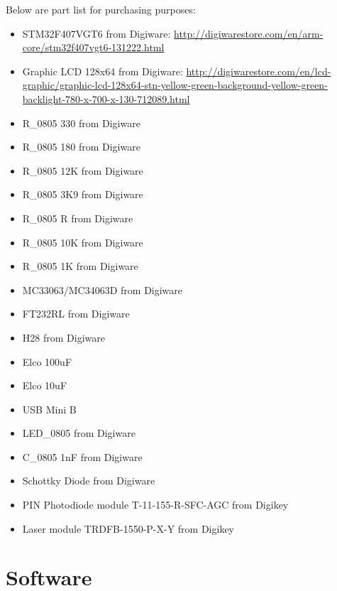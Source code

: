 \documentclass[12pt,]{book}
\begin{document}
	Below are part list for purchasing purposes:
	\begin{itemize}
		\item STM32F407VGT6 from Digiware: \url{http://digiwarestore.com/en/arm-core/stm32f407vgt6-131222.html}
		\item Graphic LCD 128x64 from Digiware: \url{http://digiwarestore.com/en/lcd-graphic/graphic-lcd-128x64-stn-yellow-green-background-yellow-green-backlight-780-x-700-x-130-712089.html} 
		\item R\_0805 330 from Digiware
		\item R\_0805 180 from Digiware
		\item R\_0805 12K from Digiware
		\item R\_0805 3K9 from Digiware
		\item R\_0805 R from Digiware
		\item R\_0805 10K from Digiware
		\item R\_0805 1K from Digiware
		\item MC33063/MC34063D  from Digiware
		\item FT232RL from Digiware
		\item H28 from Digiware
		\item Elco 100uF
		\item Elco 10uF
		\item USB Mini B
		\item LED\_0805 from Digiware
		\item C\_0805 1nF from Digiware
		\item Schottky Diode from Digiware
		\item PIN Photodiode module T-11-155-R-SFC-AGC from Digikey
		\item Laser module TRDFB-1550-P-X-Y from Digikey
	\end{itemize}
		
	\section{Software}
	
\end{document}
